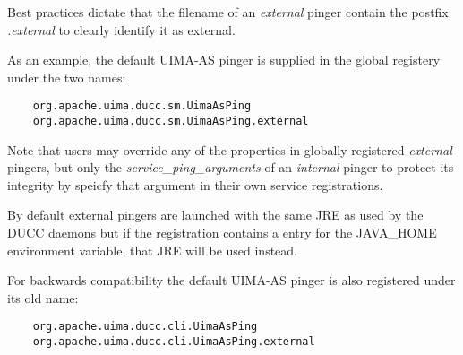     Best practices dictate that the filename of an {\em external} pinger contain the
    postfix {\em .external} to clearly identify it as external.  

    As an example, the default UIMA-AS pinger is supplied in the global registery
    under the two names:
\begin{verbatim}
    org.apache.uima.ducc.sm.UimaAsPing
    org.apache.uima.ducc.sm.UimaAsPing.external
\end{verbatim}

    Note that users may override any of the properties in globally-registered
    {\em external} pingers, but only the {\em service\_ping\_arguments} of an {\em internal}
    pinger to protect its integrity by speicfy that argument in their own
    service registrations.

    By default external pingers are launched with the same JRE as used by the DUCC daemons but if the
    registration contains a entry for the JAVA\_HOME environment variable, that JRE will be used instead.

    For backwards compatibility the default UIMA-AS pinger is also registered under its old name:
\begin{verbatim}
    org.apache.uima.ducc.cli.UimaAsPing
    org.apache.uima.ducc.cli.UimaAsPing.external
\end{verbatim}
